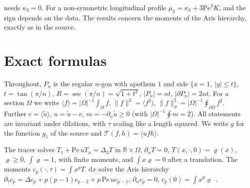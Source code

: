 \documentclass[11pt,a4paper]{report}
\DeclareRobustCommand*{\avg}[1]{\langle #1\rangle}
\DeclareRobustCommand*{\norm}[1]{\lVert #1\rVert}
\DeclareRobustCommand*{\bdnorm}[1]{\lVert #1\rVert_{\partial}}
\DeclareRobustCommand*{\ut}{\tilde u}
\DeclareRobustCommand*{\dd}{\mathop{}\!\mathrm{d}}
\DeclareRobustCommand*{\Pg}{P_n}
\begin{document}
\begin{remark}
 needs \(\kappa_3=0\). For a non-symmetric longitudinal profile
\(\mu_3=\kappa_3+3\mathrm{Pe}^3K\), and the sign depends on the data. The results concern the moments of the
Aris hierarchy, exactly as in the source.
\end{remark}

\section{Exact formulas}\label{sec:formulas}

Throughout, \(\Pg\) is the regular \(n\)-gon with apothem \(1\) and side \(\{x=1,\ |y|\le t\}\), \(t=\tan(\pi/n)\),
\(R=\sec(\pi/n)=\sqrt{1+t^2}\), \(|\Pg|=nt\), \(|\partial\Pg|=2nt\). For a section \(\Omega\) we write
\(\avg f=|\Omega|^{-1}\int_\Omega f\), \(\norm f^2=\avg{f^2}\), \(\bdnorm f^2=|\Omega|^{-1}\oint_{\partial\Omega}f^2\).
Further \(c=\avg{\ut}\), \(u=\ut-c\), \(m=-\partial_n\ut\ge0\) (with \(|\Omega|^{-1}\oint m=2\)). All statements are
invariant under dilations, with \(\tau\) scaling like a length squared. We write \(g\) for the function \(g_1\) of the
source and \(\mathcal T(f,h)=\avg{ufh}\).

The tracer solves \(T_\tau+\mathrm{Pe}\,uT_x=\Delta_3T\) in \(\mathbb R\times\Omega\), \(\partial_nT=0\),
\(T(x,\cdot,0)=\varrho(x)\), \(\varrho\ge0\), \(\int\varrho=1\), with finite moments, and
\(\int x\varrho=0\) after a translation. The moments \(c_p(\cdot,\tau)=\int x^pT\dd x\) solve the Aris hierarchy
\(\partial_\tau c_p=\Delta c_p+p(p-1)c_{p-2}+p\,\mathrm{Pe}\,uc_{p-1}\), \(\partial_nc_p=0\), \(c_p(0)=\int x^p\varrho\)~\autocite{Aris1956}.
\end{document}
